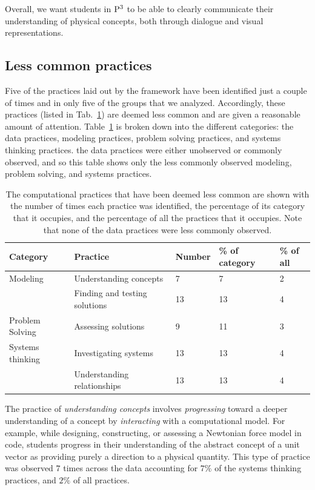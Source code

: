 \documentclass{msuphddissertation}
\begin{document}
\begin{doublespace}
Overall, we want students in ${\rm P}^{3}$ to be able to clearly communicate their understanding of physical concepts, both through dialogue and visual representations.

%
%
%
%
%
%
%
%
%
%
%
%
%
%
%
%

\subsection{Less common practices}

Five of the practices laid out by the framework have been identified just a couple of times and in only five of the groups that we analyzed.  Accordingly, these practices (listed in Tab.~\ref{CH6:LessCommon}) are deemed less common and are given a reasonable amount of attention.  Table~\ref{CH6:LessCommon} is broken down into the different categories: the data practices, modeling practices, problem solving practices, and systems thinking practices.  the data practices were either unobserved or commonly observed, and so this table shows only the less commonly observed modeling, problem solving, and systems practices.

\begin{table}[ht]\centering
\begin{tabular}{lllll}\hline\hline
Category & Practice & Number & \% of category & \% of all \\\hline
Modeling & Understanding concepts & 7 & 7 & 2 \\
 & Finding and testing solutions & 13 & 13 & 4 \\\hline
Problem Solving & Assessing solutions & 9 & 11 & 3 \\\hline
Systems thinking & Investigating systems & 13 & 13 & 4 \\
 & Understanding relationships & 13 & 13 & 4 \\\hline\hline
\end{tabular}
\caption{The computational practices that have been deemed less common are shown with the number of times each practice was identified, the percentage of its category that it occupies, and the percentage of all the practices that it occupies.  Note that none of the data practices were less commonly observed.}\label{CH6:LessCommon}
\end{table}

The practice of \textit{understanding concepts} involves \textit{progressing} toward a deeper understanding of a concept by \textit{interacting} with a computational model.  For example, while designing, constructing, or assessing a Newtonian force model in code, students progress in their understanding of the abstract concept of a unit vector as providing purely a direction to a physical quantity.  This type of practice was observed $7$ times across the data  accounting for $7\%$ of the systems thinking practices, and $2\%$ of all practices.


\end{doublespace}
\end{document}
